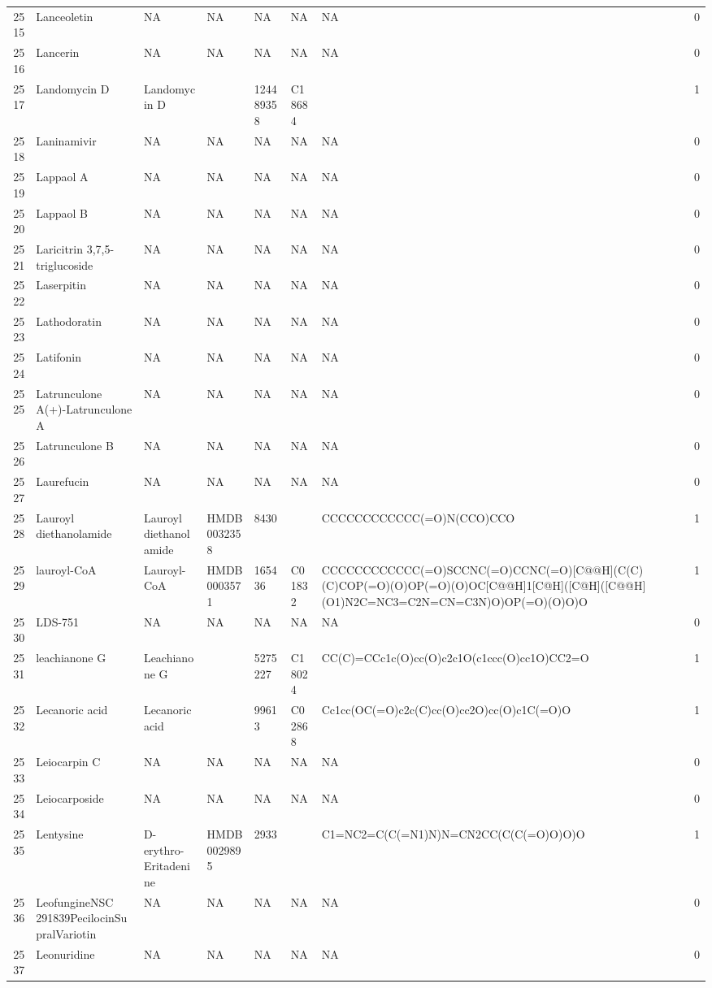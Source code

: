 \documentclass[a4paper]{article}
\begin{document}
\begin{longtable}{rlllllll}
  2515 & Lanceoletin & NA & NA & NA & NA & NA & 0 \\ 
  2516 & Lancerin & NA & NA & NA & NA & NA & 0 \\ 
  2517 & Landomycin D & Landomycin D &  & 124489358 & C18684 &  & 1 \\ 
  2518 & Laninamivir & NA & NA & NA & NA & NA & 0 \\ 
  2519 & Lappaol A & NA & NA & NA & NA & NA & 0 \\ 
  2520 & Lappaol B & NA & NA & NA & NA & NA & 0 \\ 
  2521 & Laricitrin 3,7,5-triglucoside & NA & NA & NA & NA & NA & 0 \\ 
  2522 & Laserpitin & NA & NA & NA & NA & NA & 0 \\ 
  2523 & Lathodoratin & NA & NA & NA & NA & NA & 0 \\ 
  2524 & Latifonin & NA & NA & NA & NA & NA & 0 \\ 
  2525 & Latrunculone A(+)-Latrunculone A & NA & NA & NA & NA & NA & 0 \\ 
  2526 & Latrunculone B & NA & NA & NA & NA & NA & 0 \\ 
  2527 & Laurefucin & NA & NA & NA & NA & NA & 0 \\ 
  2528 & Lauroyl diethanolamide & Lauroyl diethanolamide & HMDB0032358 & 8430 &  & CCCCCCCCCCCC(=O)N(CCO)CCO & 1 \\ 
  2529 & lauroyl-CoA & Lauroyl-CoA & HMDB0003571 & 165436 & C01832 & CCCCCCCCCCCC(=O)SCCNC(=O)CCNC(=O)[C@@H](C(C)(C)COP(=O)(O)OP(=O)(O)OC[C@@H]1[C@H]([C@H]([C@@H](O1)N2C=NC3=C2N=CN=C3N)O)OP(=O)(O)O)O & 1 \\ 
  2530 & LDS-751 & NA & NA & NA & NA & NA & 0 \\ 
  2531 & leachianone G & Leachianone G &  & 5275227 & C18024 & CC(C)=CCc1c(O)cc(O)c2c1O(c1ccc(O)cc1O)CC2=O & 1 \\ 
  2532 & Lecanoric acid & Lecanoric acid &  & 99613 & C02868 & Cc1cc(OC(=O)c2c(C)cc(O)cc2O)cc(O)c1C(=O)O & 1 \\ 
  2533 & Leiocarpin C & NA & NA & NA & NA & NA & 0 \\ 
  2534 & Leiocarposide & NA & NA & NA & NA & NA & 0 \\ 
  2535 & Lentysine & D-erythro-Eritadenine & HMDB0029895 & 2933 &  & C1=NC2=C(C(=N1)N)N=CN2CC(C(C(=O)O)O)O & 1 \\ 
  2536 & LeofungineNSC 291839PecilocinSupralVariotin & NA & NA & NA & NA & NA & 0 \\ 
  2537 & Leonuridine & NA & NA & NA & NA & NA & 0 \\ 

\end{longtable}
\end{document}
